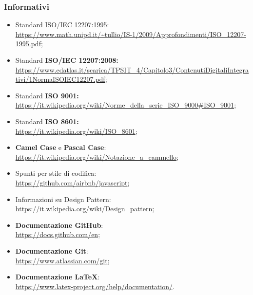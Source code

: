 \subsubsection{Informativi}
\begin{itemize}
\item Standard ISO/IEC 12207:1995:\\ \url{https://www.math.unipd.it/~tullio/IS-1/2009/Approfondimenti/ISO_12207-1995.pdf};
\item Standard \textbf{ISO/IEC 12207:2008: }\\ \url{https://www.edatlas.it/scarica/TPSIT_4/Capitolo3/ContenutiDigitaliIntegrativi/1NormaISOIEC12207.pdf};
\item Standard \textbf{ISO 9001: }\\ \url{https://it.wikipedia.org/wiki/Norme_della_serie_ISO_9000#ISO_9001};
\item Standard \textbf{ISO 8601: }\\ \url{https://it.wikipedia.org/wiki/ISO_8601};
\item \textbf{Camel Case} e \textbf{Pascal Case}:\\ \url{https://it.wikipedia.org/wiki/Notazione_a_cammello};
\item Spunti per stile di codifica:\\ \url{https://github.com/airbnb/javascript};
\item Informazioni su Design Pattern:\\ \url{https://it.wikipedia.org/wiki/Design_pattern};
\item \textbf{Documentazione GitHub}:\\ \url{https://docs.github.com/en};
\item \textbf{Documentazione Git}:\\ \url{https://www.atlassian.com/git};
\item \textbf{Documentazione \LaTeX}:\\ \url{https://www.latex-project.org/help/documentation/}.
\end{itemize}
